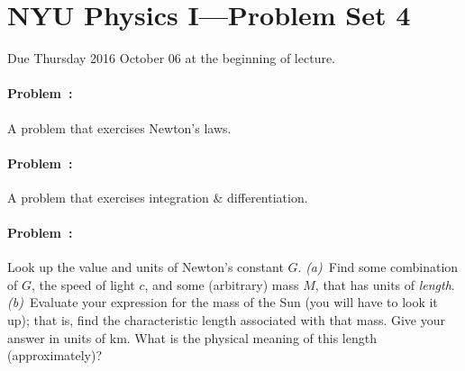\documentclass[12pt]{article}
\begin{document}
\section*{NYU Physics I---Problem Set 4}

Due Thursday 2016 October 06 at the beginning of lecture.

\paragraph{Problem~\theproblem:}%
A problem that exercises Newton's laws.

\paragraph{Problem~\theproblem:}%
A problem that exercises integration \& differentiation.

\paragraph{Problem~\theproblem:}%
Look up the value and units of Newton's constant $G$.
\textsl{(a)}~Find some combination of $G$, the speed of light $c$, and
some (arbitrary) mass $M$, that has units of \emph{length}.
\textsl{(b)}~Evaluate your expression for the mass of the Sun (you
will have to look it up); that is, find the characteristic length
associated with that mass.  Give your answer in units of km.  What is
the physical meaning of this length (approximately)?
\end{document}
